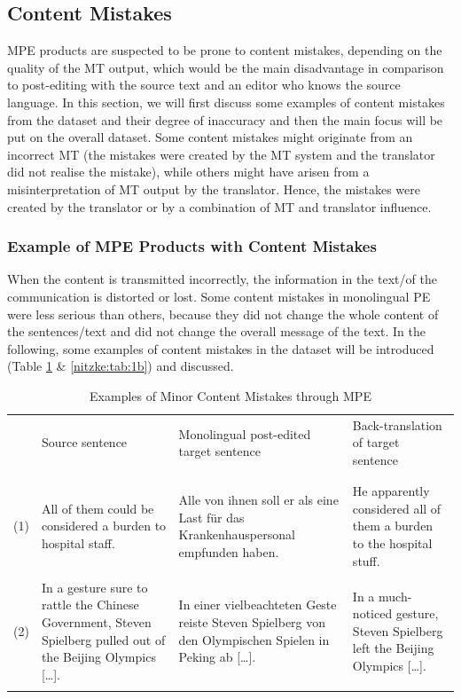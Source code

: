 \documentclass[output=paper]{langsci/langscibook}
\begin{document}
\subsection{Content Mistakes\label{nitzke:sec:ContentMistakes}}

MPE products are suspected to be prone to content mistakes, depending on the quality of the MT output, which would be the main disadvantage in comparison to post-editing with the source text and an editor who knows the source language. In this section, we will first discuss some examples of content mistakes from the dataset and their degree of inaccuracy and then the main focus will be put on the overall dataset. Some content mistakes might originate from an incorrect MT (the mistakes were created by the MT system and the translator did not realise the mistake), while others might have arisen from a misinterpretation of MT output by the translator. Hence, the mistakes were created by the translator or by a combination of MT and translator influence.

\subsubsection{ Example of MPE Products with Content Mistakes\label{nitzke:sec:ExampleOfMPEProducts}}

When the content is transmitted incorrectly, the information in the text/of the communication is distorted or lost. Some content mistakes in monolingual PE were less serious than others, because they did not change the whole content of the sentences/text and did not change the overall message of the text. In the following, some examples of content mistakes in the dataset will be introduced (Table \ref{nitzke:tab:1a} \& \ref{nitzke:tab:1b}) and discussed.

\begin{table}
\begin{tabularx}{\textwidth}{lXp{3.6cm}p{3cm}} 
    & Source \newline sentence & Monolingual post-\newline edited target sentence & Back-translation of target sentence \\
\lsptoprule
\multicolumn{3}{l}{Minor content mistakes}\\ 
\\[.1em]
(1) & All of them could be considered a burden to hospital staff. 
  & \raggedright Alle von ihnen soll er als eine Last für das Krankenhauspersonal empfunden haben. & He apparently considered all of them a burden to the hospital stuff.\\ 
\\[.1em]
(2) 
  &   In a gesture sure to rattle the Chinese Government, Steven Spielberg pulled out of the Beijing Olympics [\ldots]. & \raggedright  In einer vielbeachteten Geste reiste Steven Spielberg von den Olympischen Spielen in Peking ab [\ldots]. & In a much-noticed gesture, Steven Spielberg left the Beijing Olympics [\ldots].\\
\lspbottomrule
\end{tabularx}
\caption{Examples of Minor Content Mistakes through MPE}
\label{nitzke:tab:1a}
\end{table}
\end{document}
